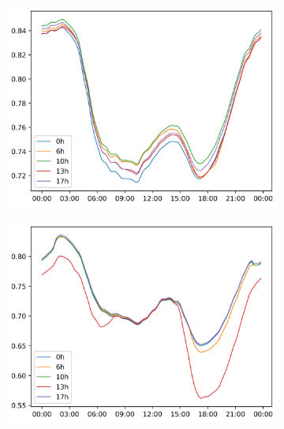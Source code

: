 \begin{figure}[H]
\begin{subfigure}{.5\textwidth}
        \centering
        \includegraphics[width=\linewidth]{img/switchstate_exploring/suburb2/switchstates_over_time.png}
        \caption{}
        \label{fig:time:suburb2:best_at_different_times}
    \end{subfigure}%
    \begin{subfigure}{.5\textwidth}
        \centering
        \includegraphics[width=\linewidth]{img/switchstate_exploring/urban2/switchstates_over_time.png}
        \caption{}
        \label{fig:time:urban2:best_at_different_times}
    \end{subfigure}
    \caption{}
    \label{fig:time}
\end{figure}